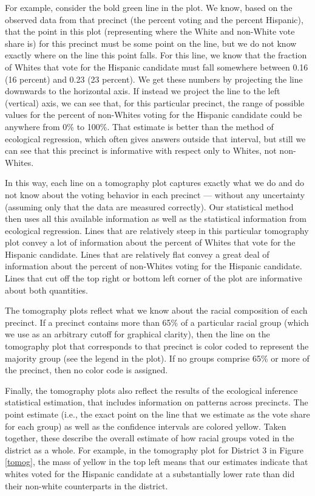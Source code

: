 \documentclass[12pt]{article}
\begin{document}
For example, consider the bold green line in the plot. We know, based
on the observed data from that precinct (the percent voting and the
percent Hispanic), that the point in this plot (representing where the
White and non-White vote share is) for this precinct must be some
point on the line, but we do not know exactly where on the line this
point falls. For this line, we know that the fraction of Whites that
vote for the Hispanic candidate must fall somewhere between 0.16 (16
percent) and 0.23 (23 percent). We get these numbers by projecting the
line downwards to the horizontal axis. If instead we project the line
to the left (vertical) axis, we can see that, for this particular
precinct, the range of possible values for the percent of non-Whites
voting for the Hispanic candidate could be anywhere from 0\% to 100\%.
That estimate is better than the method of ecological regression,
which often gives answers outside that interval, but still we can see
that this precinct is informative with respect only to Whites, not
non-Whites. 

In this way, each line on a tomography plot captures exactly what we
do and do not know about the voting behavior in each precinct ---
without any uncertainty (assuming only that the data are measured
correctly). Our statistical method then uses all this available
information as well as the statistical information from ecological
regression. Lines that are relatively steep in this particular
tomography plot convey a lot of information about the percent of
Whites that vote for the Hispanic candidate.  Lines that are
relatively flat convey a great deal of information about the percent
of non-Whites voting for the Hispanic candidate.  Lines that cut off
the top right or bottom left corner of the plot are informative about
both quantities.

The tomography plots reflect what we know about the racial composition
of each precinct. If a precinct contains more than 65\% of a
particular racial group (which we use as an arbitrary cutoff for
graphical clarity), then the line on the tomography plot that
corresponds to that precinct is color coded to represent the majority
group (see the legend in the plot). If no groups comprise 65\% or more
of the precinct, then no color code is assigned.  

Finally, the tomography plots also reflect the results of the
ecological inference statistical estimation, that includes information
on patterns across precincts. The point estimate (i.e., the exact
point on the line that we estimate as the vote share for each group)
as well as the confidence intervals are colored yellow.  Taken
together, these describe the overall estimate of how racial groups
voted in the district as a whole. For example, in the tomography plot
for District 3 in Figure \ref{tomog}, the mass of yellow in the top
left means that our estimates indicate that whites voted for the
Hispanic candidate at a substantially lower rate than did their
non-white counterparts in the district.  
\end{document}
